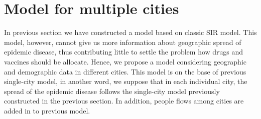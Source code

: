 \section{Model for multiple cities}
In previous section we have constructed a model based on classic SIR model. This model, however, cannot give us more information about geographic spread of epidemic disease, thus contributing little to settle the problem how drugs and vaccines should be allocate. Hence, we propose a model considering geographic and demographic data in different cities. This model is on the base of previous single-city model, in another word, we suppose that in each individual city, the spread of the epidemic disease follows the single-city model previously constructed in the previous section. In addition, people flows among cities are added in to previous model.


